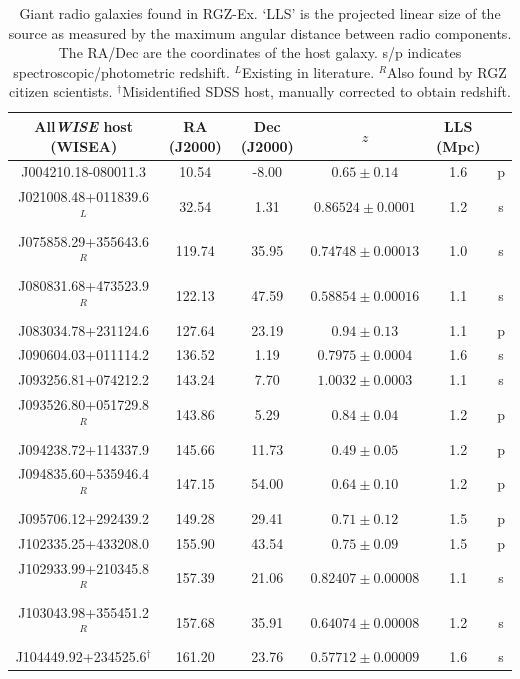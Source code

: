     \begin{table}
      \caption[Giant radio galaxies found in RGZ-Ex.]{\label{tab:grg} Giant radio galaxies found in RGZ-Ex. `LLS' is the projected linear size of the source as measured by the maximum angular distance between radio components. The RA/Dec are the coordinates of the host galaxy. s/p indicates spectroscopic/photometric redshift. ${}^L$Existing in literature. ${}^R$Also found by RGZ citizen scientists. ${}^\dagger$Misidentified SDSS host, manually corrected to obtain redshift.}
      \centering
      \begin{footnotesize}\begin{tabular}{c|ccccc}
  \hline\hline
  All\emph{WISE} host (WISEA) & RA (J2000) & Dec (J2000) & $z$ & LLS (Mpc) &\\
  \hline
    J004210.18-080011.3 & 10.54 & -8.00 & $0.65 \pm 0.14$ & 1.6 & p\\ %
    J021008.48+011839.6${}^L$ & 32.54 & 1.31 & $0.86524 \pm 0.0001$ & 1.2 & s\\ %
    J075858.29+355643.6${}^R$ & 119.74 & 35.95 & $0.74748 \pm 0.00013$ & 1.0 & s\\ %
    J080831.68+473523.9${}^R$ & 122.13 & 47.59 & $0.58854 \pm 0.00016$ & 1.1 & s\\ %
    J083034.78+231124.6 & 127.64 & 23.19 & $0.94 \pm 0.13$ & 1.1 & p\\ %
    J090604.03+011114.2 & 136.52 & 1.19 & $0.7975 \pm 0.0004$ & 1.6 & s\\ %
    J093256.81+074212.2 & 143.24 & 7.70 & $1.0032 \pm 0.0003$ & 1.1 & s\\ %
    J093526.80+051729.8${}^R$ & 143.86 & 5.29 & $0.84 \pm 0.04$ & 1.2 & p\\ %
    J094238.72+114337.9 & 145.66 & 11.73 & $0.49 \pm 0.05$ & 1.2 & p\\ %
    J094835.60+535946.4${}^R$ & 147.15 & 54.00 & $0.64 \pm 0.10$ & 1.2 & p\\ %
    J095706.12+292439.2 & 149.28 & 29.41 & $0.71 \pm 0.12$ & 1.5 & p\\ %
    J102335.25+433208.0 & 155.90 & 43.54 & $0.75 \pm 0.09$ & 1.5 & p\\ %
    J102933.99+210345.8${}^R$ & 157.39 & 21.06 & $0.82407 \pm 0.00008$ & 1.1 & s\\ %
    J103043.98+355451.2${}^R$ & 157.68 & 35.91 & $0.64074 \pm 0.00008$ & 1.2 & s\\ %
    J104449.92+234525.6${}^\dagger$ & 161.20 & 23.76 & $0.57712 \pm 0.00009$ & 1.6 & s\\ %

\end{tabular}
\end{footnotesize}
\end{table}
